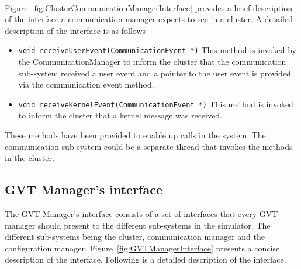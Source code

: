 \begin{figure*}
\begin{center}
\ 
\end{center}
\caption{The interface a cluster should provide to a communication 
  manager.}\label{fig:ClusterCommunicationManagerInterface}
\end{figure*}

Figure~\ref{fig:ClusterCommunicationManagerInterface} provides a brief
description of the interface a communication manager expects to see in a
cluster. A detailed description of the interface is as follows

\begin{itemize}
\item {\tt void receiveUserEvent(CommunicationEvent *)} This method is
  invoked by the CommunicationManager to inform the cluster that the
  communication sub-system received a user event and a pointer to the user
  event is provided via the communication event method.

\item {\tt void receiveKernelEvent(CommunicationEvent *)} This method is
  invoked to inform the cluster that a kernel message was received.
\end{itemize}

These methods have been provided to enable up calls in the system. The
communication sub-system could be a separate thread that invokes the
methods in the cluster.

\subsection{GVT Manager's interface}

The GVT Manager's interface consists of a set of interfaces that every GVT
manager should present to the different sub-systems in the simulator. The
different sub-systems being the cluster, communication manager and the
configuration manager. Figure~\ref{fig:GVTManagerInterface} presents a
concise description of the interface. Following is a detailed description
of the interface.

\begin{figure*}
\begin{center}
  \ 
\end{center}
\caption{The interface a GVT Manager should
  provide.}\label{fig:GVTManagerInterface}
\end{figure*}

